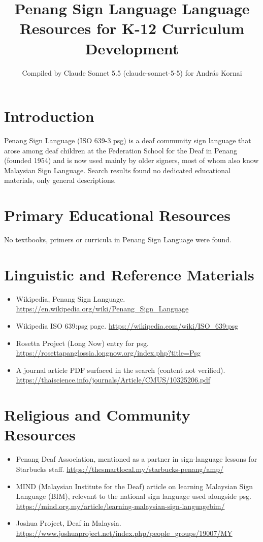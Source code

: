 \documentclass[12pt]{article}
\title{Penang Sign Language Language Resources for K-12 Curriculum Development}
\author{Compiled by Claude Sonnet 5.5 (claude-sonnet-5-5) for Andr\'as Kornai}
\date{}
\begin{document}
\maketitle

\section{Introduction}
Penang Sign Language (ISO 639-3 psg) is a deaf community sign language that arose among deaf children at the Federation School for the Deaf in Penang (founded 1954) and is now used mainly by older signers, most of whom also know Malaysian Sign Language. Search results found no dedicated educational materials, only general descriptions.

\section{Primary Educational Resources}
No textbooks, primers or curricula in Penang Sign Language were found.

\section{Linguistic and Reference Materials}
\begin{itemize}
\item Wikipedia, Penang Sign Language. \url{https://en.wikipedia.org/wiki/Penang_Sign_Language}
\item Wikipedia ISO 639:psg page. \url{https://wikipedia.com/wiki/ISO_639:psg}
\item Rosetta Project (Long Now) entry for psg. \url{https://rosettapanglossia.longnow.org/index.php?title=Psg}
\item A journal article PDF surfaced in the search (content not verified). \url{https://thaiscience.info/journals/Article/CMUS/10325206.pdf}
\end{itemize}

\section{Religious and Community Resources}
\begin{itemize}
\item Penang Deaf Association, mentioned as a partner in sign-language lessons for Starbucks staff. \url{https://thesmartlocal.my/starbucks-penang/amp/}
\item MIND (Malaysian Institute for the Deaf) article on learning Malaysian Sign Language (BIM), relevant to the national sign language used alongside psg. \url{https://mind.org.my/article/learning-malaysian-sign-languagebim/}
\item Joshua Project, Deaf in Malaysia. \url{https://www.joshuaproject.net/index.php/people_groups/19007/MY}
\end{itemize}
\end{document}
